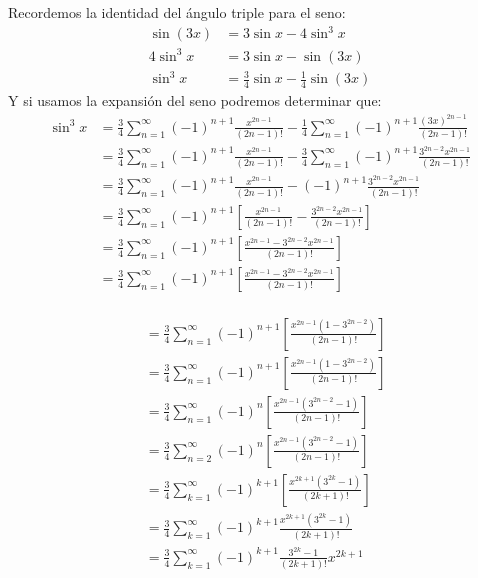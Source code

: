 \documentclass[../main.tex]{subfiles}
\begin{document}
Recordemos la identidad del ángulo triple para el seno:
\begin{align*}
    \sin(3x) &= 3\sin x - 4\sin^3x\\
    4\sin^3x &= 3\sin x - \sin(3x)\\
    \sin^3x &= \frac{3}{4} \sin x - \frac{1}{4} \sin (3x)
\end{align*}
Y si usamos la expansión del seno podremos determinar que:
\begin{align*}
    \sin^3x &= \frac{3}{4} \sum_{n = 1}^\infty (-1)^{n+1} \frac{x^{2n-1}}{(2n-1)!} - \frac{1}{4} \sum_{n = 1}^\infty (-1)^{n+1} \frac{(3x)^{2n-1}}{(2n-1)!}\\
    &= \frac{3}{4} \sum_{n = 1}^\infty (-1)^{n+1} \frac{x^{2n-1}}{(2n-1)!} - \frac{3}{4} \sum_{n = 1}^\infty (-1)^{n+1} \frac{3^{2n-2} x^{2n-1}}{(2n-1)!}\\
    &= \frac{3}{4} \sum_{n = 1}^\infty (-1)^{n+1} \frac{x^{2n-1}}{(2n-1)!} - (-1)^{n+1} \frac{3^{2n-2} x^{2n-1}}{(2n-1)!}\\
    &= \frac{3}{4} \sum_{n = 1}^\infty (-1)^{n+1} \left[\frac{x^{2n-1}}{(2n-1)!} - \frac{3^{2n-2} x^{2n-1}}{(2n-1)!}\right]\\
    &= \frac{3}{4} \sum_{n = 1}^\infty (-1)^{n+1} \left[\frac{x^{2n-1} - 3^{2n-2} x^{2n-1}}{(2n-1)!}\right]\\
    &= \frac{3}{4} \sum_{n = 1}^\infty (-1)^{n+1} \left[\frac{x^{2n-1} - 3^{2n-2} x^{2n-1}}{(2n-1)!}\right]\\
\end{align*}

\begin{align*}
    &= \frac{3}{4} \sum_{n = 1}^\infty (-1)^{n+1} \left[\frac{x^{2n-1} (1-3^{2n-2})}{(2n-1)!}\right]\\
    &= \frac{3}{4} \sum_{n = 1}^\infty (-1)^{n+1} \left[\frac{x^{2n-1} (1-3^{2n-2})}{(2n-1)!}\right]\\
    &= \frac{3}{4} \sum_{n = 1}^\infty (-1)^{n} \left[\frac{x^{2n-1} (3^{2n-2}-1)}{(2n-1)!}\right]\\
    &= \frac{3}{4} \sum_{n = 2}^\infty (-1)^{n} \left[\frac{x^{2n-1} (3^{2n-2}-1)}{(2n-1)!}\right]\\
    &= \frac{3}{4} \sum_{k = 1}^\infty (-1)^{k+1} \left[\frac{x^{2k+1} (3^{2k}-1)}{(2k+1)!}\right]\\
    &= \frac{3}{4} \sum_{k = 1}^\infty (-1)^{k+1} \frac{x^{2k+1} (3^{2k}-1)}{(2k+1)!}\\
    &= \frac{3}{4} \sum_{k = 1}^\infty (-1)^{k+1} \frac{3^{2k}-1}{(2k+1)!} x^{2k+1} \\
\end{align*}
\end{document}
